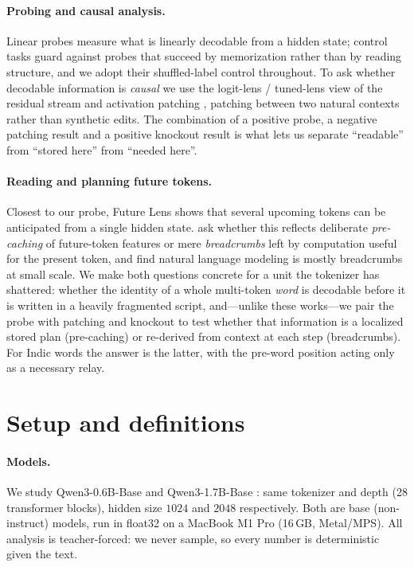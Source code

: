 \documentclass[11pt]{article}
\begin{document}
\paragraph{Probing and causal analysis.} Linear probes
\citep{alain2017probes} measure what is linearly decodable from a hidden
state; control tasks \citep{hewitt2019control} guard against probes that
succeed by memorization rather than by reading structure, and we adopt their
shuffled-label control throughout. To ask whether decodable information is
\emph{causal} we use the logit-lens / tuned-lens view of the residual stream
\citep{belrose2023tunedlens,elhage2021framework} and activation patching
\citep{meng2022rome,wang2023ioi,goldowskydill2023pathpatching}, patching
between two natural contexts rather than synthetic edits. The combination of a
positive probe, a negative patching result and a positive knockout result is
what lets us separate ``readable'' from ``stored here'' from ``needed here''.

\paragraph{Reading and planning future tokens.} Closest to our probe, Future
Lens \citep{pal2023futurelens} shows that several upcoming tokens can be
anticipated from a single hidden state. \citet{wu2024planahead} ask whether
this reflects deliberate \emph{pre-caching} of future-token features or mere
\emph{breadcrumbs} left by computation useful for the present token, and find
natural language modeling is mostly breadcrumbs at small scale. We make both
questions concrete for a unit the tokenizer has shattered: whether the identity
of a whole multi-token \emph{word} is decodable before it is written in a
heavily fragmented script, and---unlike these works---we pair the probe with
patching and knockout to test whether that information is a localized stored
plan (pre-caching) or re-derived from context at each step (breadcrumbs). For
Indic words the answer is the latter, with the pre-word position acting only as
a necessary relay.

\section{Setup and definitions}
\label{sec:setup}

\paragraph{Models.} We study Qwen3-0.6B-Base and Qwen3-1.7B-Base
\citep{qwen2024}: same tokenizer and depth (28 transformer blocks), hidden
size $1024$ and $2048$ respectively. Both are base (non-instruct) models, run
in float32 on a MacBook M1 Pro (16\,GB, Metal/MPS). All analysis is
teacher-forced: we never sample, so every number is deterministic given the
text.
\end{document}
